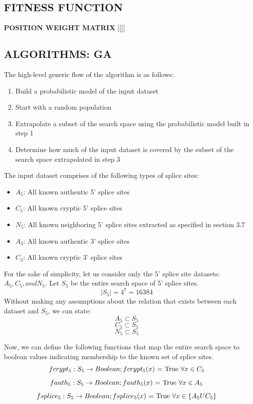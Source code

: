 \documentclass[12pt,a4paper]{article}
\begin{document}
	\subsection{FITNESS FUNCTION}
	\textbf{POSITION WEIGHT MATRIX}
	[[]]
	
	\subsection{ALGORITHMS: GA}
	
	The high-level generic flow of the algorithm is as follows:
	\begin{enumerate}
		\item Build a probabilistic model of the input dataset
		\item Start with a random population
		\item Extrapolate a subset of the search space using the probabilistic model built in step 1
		\item Determine how much of the input dataset is covered by the subset of the search space extrapolated in step 3
	\end{enumerate}

	The input dataset comprises of the following types of splice sites:
	\begin{itemize}
		\item $A_5$: All known authentic 5’ splice sites
		\item $C_5$: All known cryptic 5’ splice sites
		\item $N_5$: All known neighboring 5' splice sites extracted as specified in section 3.7
		\item $A_3$: All known authentic 3’ splice sites
		\item $C_3$: All known cryptic 3’ splice sites		
	\end{itemize}
			
	For the sake of simplicity, let us consider only the 5' splice site datasets: $A_5, C_5, and N_5$.
	Let $S_5$ be the entire search space of 5' splice sites.
	$$|S_5| = 4^7 = 16384$$
	Without making any assumptions about the relation that exists between each dataset and $S_5$, we can state: 
	$$ A_5 \subset S_5 $$ 
	$$ C_5 \subset S_5 $$
	$$ N_5 \subset S_5 $$

	Now, we can define the following functions that map the entire search space to boolean values indicating membership to the known set of splice sites.
	$$ fcrypt_5:  S_5 \rightarrow Boolean; fcrypt_5(x)\textnormal{ = True  }\forall x \in C_5 $$
	$$ fauth_5: S_5 \rightarrow Boolean; fauth_5(x)\textnormal{ = True  }\forall x \in A_5 $$
	$$ fsplice_5: S_5 \rightarrow Boolean; fsplice_5(x)\textnormal{ = True  }\forall x \in \{A_5 U C_5\} $$
	
\end{document}
